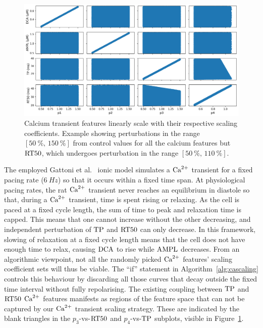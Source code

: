 \begin{figure}[ht!]
    \myfloatalign
    \includegraphics[width=\textwidth]{figures/chapter06/p_vs_b.png}
    \caption{Calcium transient features linearly scale with their respective scaling coefficients. Example showing perturbations in the range $[\SI{50}{\percent},\,\SI{150}{\percent}]$ from control values for all the calcium features but $\textrm{RT50}$, which undergoes perturbation in the range $[\SI{50}{\percent},\,\SI{110}{\percent}]$.}
    \label{fig:scalersvscafeatures}
\end{figure}

\vspace{0.2cm}
The employed Gattoni et al.~\cite{Gattoni:2017} ionic model simulates a $\textrm{Ca}^{2+}$ transient for a fixed pacing rate ($\SI{6}{Hz}$) so that it occurs within a fixed time span. At physiological pacing rates, the rat $\textrm{Ca}^{2+}$ transient never reaches an equilibrium in diastole so that, during a $\textrm{Ca}^{2+}$ transient, time is spent rising or relaxing. As the cell is paced at a fixed cycle length, the sum of time to peak and relaxation time is capped. This means that one cannot increase without the other decreasing, and independent perturbation of $\textrm{TP}$ and $\textrm{RT50}$ can only decrease. In this framework, slowing of relaxation at a fixed cycle length means that the cell does not have enough time to relax, causing $\textrm{DCA}$ to rise while $\textrm{AMPL}$ decreases. From an algorithmic viewpoint, not all the randomly picked $\textrm{Ca}^{2+}$ features' scaling coefficient sets will thus be viable. The ``if'' statement in Algorithm~\ref{alg:cascaling} controls this behaviour by discarding all those curves that decay outside the fixed time interval without fully repolarising. The existing coupling between $\textrm{TP}$ and $\textrm{RT50}$ $\textrm{Ca}^{2+}$ features manifests as regions of the feature space that can not be captured by our $\textrm{Ca}^{2+}$ transient scaling strategy. These are indicated by the blank triangles in the $p_3$-vs-$\textrm{RT50}$ and $p_4$-vs-$\textrm{TP}$ subplots, visible in Figure~\ref{fig:scalersvscafeatures}.



